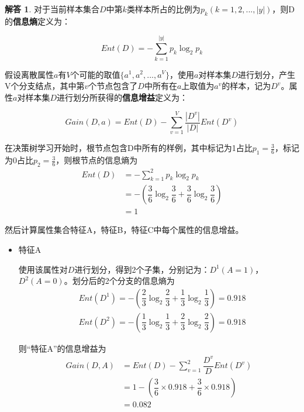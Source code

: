 \documentclass[a4paper,UTF8]{article}
\numberwithin{equation}{section}
\theoremstyle{definition}
\newtheorem*{solution}{解答}
\begin{document}
\begin{solution}

对于当前样本集合$D$中第$k$类样本所占的比例为$p_k (k=1,2,...,|y|)$，则D的\textbf{信息熵}定义为：

\begin{equation}
Ent(D)=-\sum_{k=1}^{|y|}p_k\log_{2}{p_k}
\end{equation}

假设离散属性$a$有$V$个可能的取值$\{a^1,a^2,...,a^V\}$，使用$a$对样本集$D$进行划分，产生V个分支结点，其中第$v$个节点包含了$D$中所有在$a$上取值为$a^v$的样本，记为$D^v$。属性$a$对样本集$D$进行划分所获得的\textbf{信息增益}定义为：

\begin{equation}
Gain(D,a)=Ent(D)-\sum_{v=1}^{V}\dfrac{|D^v|}{|D|}Ent(D^v)
\end{equation}

在决策树学习开始时，根节点包含D中所有的样例，其中标记为1占比$p_1=\frac{3}{6}$，标记为0占比$p_2=\frac{3}{6}$，则根节点的信息熵为
\begin{align*}
Ent(D) &= -\sum_{k=1}^{2}p_k\log_{2}{p_k} \\
       &= -(\dfrac{3}{6}\log_{2}{\dfrac{3}{6}}+\dfrac{3}{6}\log_{2}{\dfrac{3}{6}}) \\
       &= 1
\end{align*}

然后计算属性集合{特征A，特征B，特征C}中每个属性的信息增益。
\begin{itemize}
    \item 特征A 

        使用该属性对$D$进行划分，得到2个子集，分别记为：$D^1(A=1)$，$D^2(A=0)$。划分后的2个分支的信息熵为
        \begin{align*}
            &Ent(D^1) = -(\dfrac{2}{3}\log_{2}{\dfrac{2}{3}}+\dfrac{1}{3}\log_{2}{\dfrac{1}{3}}) = 0.918 \\
            &Ent(D^2) = -(\dfrac{1}{3}\log_{2}{\dfrac{1}{3}}+\dfrac{2}{3}\log_{2}{\dfrac{2}{3}}) = 0.918
        \end{align*}

        则“特征A”的信息增益为
        \begin{align*}
            Gain(D,A) &= Ent(D)-\sum_{v=1}^{2}\dfrac{D^v}{D}Ent(D^v) \\
                      &= 1 - (\dfrac{3}{6} \times 0.918 + \dfrac{3}{6} \times 0.918) \\
                      &= 0.082
        \end{align*}
        

\end{itemize}
\end{solution}
\end{document}
